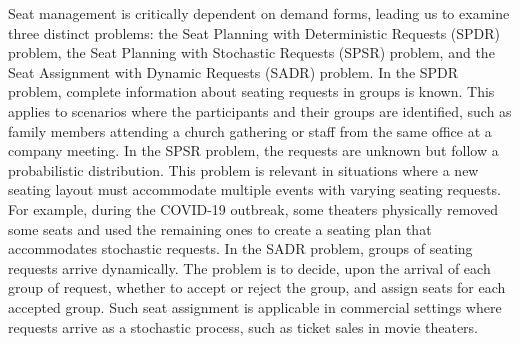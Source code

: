 Seat management is critically dependent on demand forms, leading us to examine three distinct problems:
the Seat Planning with Deterministic Requests (SPDR) problem, the Seat Planning with Stochastic Requests (SPSR) problem, and the Seat Assignment with Dynamic Requests (SADR) problem. In the SPDR problem, complete information about seating requests in groups is known. This applies to scenarios where the participants and their groups are identified, such as family members attending a church gathering or staff from the same office at a company meeting. In the SPSR problem, the requests are unknown but follow a probabilistic distribution. This problem is relevant in situations where a new seating layout must accommodate multiple events with varying seating requests. For example, during the COVID-19 outbreak, some theaters physically removed some seats and used the remaining ones to create a seating plan that accommodates stochastic requests. In the SADR problem, groups of seating requests arrive dynamically. The problem is to decide, upon the arrival of each group of request, whether to accept or reject the group, and assign seats for each accepted group. Such seat assignment is applicable in commercial settings where requests arrive as a stochastic process, such as ticket sales in movie theaters.



 

